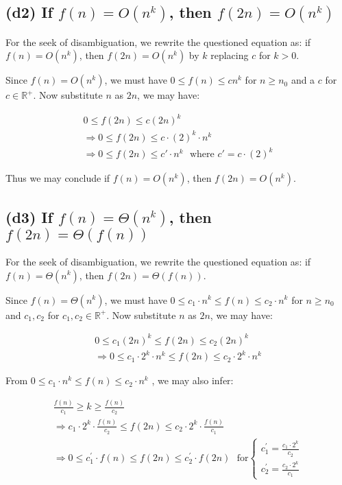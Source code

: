 \documentclass[12pt]{article}
\begin{document}
\subsection{(d2) If $f(n) = O(n^k)$, then $f(2n) = O(n^k)$}


For the seek of disambiguation, we rewrite the questioned equation as: if $f(n) = O(n^k)$, then $f(2n) = O(n^k)$ by $k$ replacing $c$ for $k > 0$.


Since $f(n) = O(n^k)$, we must have $0 \leq f(n) \leq cn^k$ for $n \geq n_0$ and a $c$ for $c \in \mathbb{R^+}$. Now substitute $n$ as $2n$, we may have:

\begin{gather}
    0 \leq f(2n) \leq c(2n)^k \nonumber \\
    \Rightarrow 0 \leq f(2n) \leq c\cdot (2)^k \cdot n^k \\
    \Rightarrow 0 \leq f(2n) \leq c' \cdot n^k \ \ \ \text{where $c' = c\cdot (2)^k$}
\end{gather}

Thus we may conclude if $f(n) = O(n^k)$, then $f(2n) = O(n^k)$.

\subsection{(d3) If $f(n) = \Theta(n^k)$, then $f(2n) = \Theta(f(n))$}

For the seek of disambiguation, we rewrite the questioned equation as: if $f(n) = \Theta(n^k)$, then $f(2n) = \Theta(f(n))$.

Since $f(n) = \Theta(n^k)$, we must have $0 \leq c_1 \cdot n^k \leq f(n) \leq c_2 \cdot n^k$ for $n \geq n_0$ and $c_1, c_2$ for $c_1, c_2 \in \mathbb{R^+}$. Now substitute $n$ as $2n$, we may have:

\begin{gather}
    0 \leq c_1 (2n)^k \leq f(2n) \leq c_2 (2n)^k \nonumber \\
    \Rightarrow 0 \leq c_1 \cdot 2^k \cdot n^k \leq f(2n) \leq c_2 \cdot 2^k \cdot n^k
\end{gather}

From $0 \leq c_1 \cdot n^k \leq f(n) \leq c_2 \cdot n^k$ , we may also infer:

\begin{gather}
    \frac{f(n)}{c_1} \geq k \geq \frac{f(n)}{c_2} \\
    \Rightarrow c_1 \cdot 2^k \cdot \frac{f(n)}{c_2} \leq f(2n) \leq c_2 \cdot 2^k \cdot \frac{f(n)}{c_1} \\
    \Rightarrow 0\leq c^{'}_{1}\cdot f(n) \leq f(2n) \leq c^{'}_{2}\cdot f(2n) \ \ \ \text{for}\begin{cases}
                    c^{'}_{1} = \frac{c_1 \cdot 2^k}{c_2} \\
                    c^{'}_{2} = \frac{c_2 \cdot 2^k}{c_1}
                \end{cases}
\end{gather}
\end{document}
